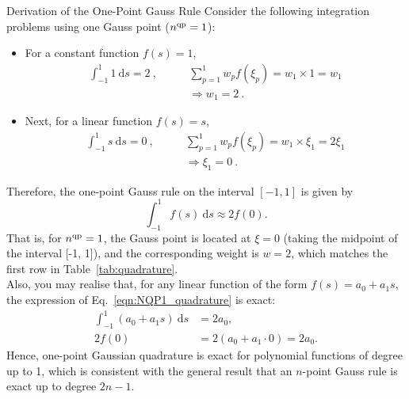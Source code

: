 \documentclass[12pt, a4paper]{article}
\numberwithin{equation}{section}
\begin{document}
\begin{example}{Derivation of the One-Point Gauss Rule}
Consider the following integration problems using one Gauss point ($n^{\rm qp} = 1$):

\begin{itemize}
    \item For a constant function  $f(s) = 1$, \begin{align*}
        \int_{-1}^{1} 1 \ \mathrm{d}s = 2 \ ,
        \quad \quad
        & \sum_{p=1}^{1} w_p f(\xi_p) = w_1 \times 1 = w_1 \\
        & \Rightarrow w_1 = 2 \ .
    \end{align*}

    \item Next, for a linear function $f(s) = s$,
    \begin{align*}
        \int_{-1}^{1} s \ \mathrm{d}s = 0 \ ,
        \quad \quad
        & \sum_{p=1}^{1} w_p f(\xi_p) = w_1 \times \xi_1 = 2 \xi_1 \\
        & \Rightarrow \xi_1 = 0 \ .
    \end{align*}
\end{itemize} 

Therefore, the one-point Gauss rule on the interval $[-1,1]$ is given by
\begin{equation}
\label{eqn:NQP1_quadrature}
    \int_{-1}^{1} f(s) \ \mathrm{d}s \approx 2 f(0). \tag{\star}
\end{equation}
That is, for $n^{\rm qp}=1$, the Gauss point is located at $\xi=0$ (taking the midpoint of the interval [-1, 1]), and the corresponding weight is $w=2$, which matches the first row in Table~\ref{tab:quadrature}. \\

Also, you may realise that, for any linear function of the form $f(s)=a_0+a_1s$, the expression of Eq.~\eqref{eqn:NQP1_quadrature} is exact:
\begin{align*}
    \int_{-1}^{1} (a_0+a_1s) \ \mathrm{d}s
    &= 2a_0, \\
    2f(0)
    &= 2(a_0+a_1 \cdot 0)
    = 2a_0.
\end{align*}
Hence, one-point Gaussian quadrature is exact for polynomial functions of degree up to 1, which is consistent with the general result that an $n$-point Gauss rule is exact up to degree $2n-1$.
\end{example}
\end{document}
